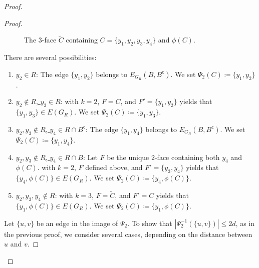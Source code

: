 \documentclass[11pt,a4paper,oneside,reqno]{amsart}
\begin{document}
\begin{proof}
\begin{proof}
\begin{figure}[h]
{\hfil}
      \caption{The $3$-face $\tilde{C}$ containing $C=\{y_1,y_2,y_3,y_4\}$ and $\phi(C)$.}
      \label{fig:fig3}
    \end{figure}

    There are several possibilities:
    \begin{enumerate}[label=(\roman*)]
    \item
      \underline{$y_2\in R$}: The edge $\{y_1, y_2\}$ belongs to $E_{G_R}(B, B^{\mathsf{c}})$.  We set $\Psi_2(C) \coloneqq \{y_1,y_2\}$.
    \item 
      \underline{$y_2\notin R$, $y_3\in R$}:  with $k=2$, $F=C$, and $F'=\{y_1,y_2\}$ yields that $\{y_1, y_3\} \in E(G_R)$. We set $\Psi_2(C) \coloneqq \{y_1,y_3\}$.
    \item
      \underline{$y_2,y_3\notin R$, $y_4\in R \cap B^{\mathsf{c}}$}: The edge $\{y_1, y_4\}$ belongs to $E_{G_R}(B, B^{\mathsf{c}})$.  We set $\Psi_2(C) \coloneqq \{y_1,y_4\}$.
    \item 
      \underline{$y_2,y_3\notin R$, $y_4\in R\cap B$}: Let $F$ be the unique $2$-face containing both $y_4$ and $\phi(C)$.   with $k=2$, $F$ defined above, and $F' = \{y_3,y_4\}$ yields that  $\{y_4, \phi(C)\} \in E(G_R)$. We set $\Psi_2(C) \coloneqq \{y_4,\phi(C)\}$.
    \item 
      \underline{$y_2,y_3,y_4 \notin R$}:  with $k=3$, $F=\tilde{C}$, and $F'=C$ yields that $\{y_1,\phi(C)\} \in E(G_R)$.  We set $\Psi_2(C) \coloneqq \{y_1,\phi(C)\}$.
    \end{enumerate}

    Let $\{u,v\}$ be an edge in the image of $\Psi_2$.
    To show that $|\Psi_2^{-1}(\{u,v\})|\leq 2d$, as in the previous proof, we consider several cases, depending on the distance between $u$ and $v$.


\end{proof}
\end{proof}
\end{document}
